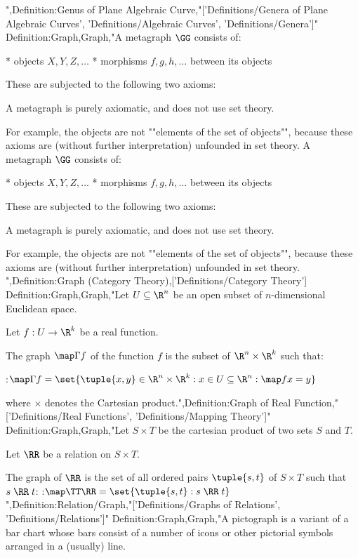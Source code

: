 ",Definition:Genus of Plane Algebraic Curve,"['Definitions/Genera of Plane Algebraic Curves', 'Definitions/Algebraic Curves', 'Definitions/Genera']"
Definition:Graph,Graph,"A metagraph $\GG$ consists of:

* objects $X, Y, Z, \ldots$
* morphisms $f, g, h, \ldots$ between its objects

These are subjected to the following two axioms:







A metagraph is purely axiomatic, and does not use set theory.

For example, the objects are not ""elements of the set of objects"", because these axioms are (without further interpretation) unfounded in set theory.
A metagraph $\GG$ consists of:

* objects $X, Y, Z, \ldots$
* morphisms $f, g, h, \ldots$ between its objects

These are subjected to the following two axioms:







A metagraph is purely axiomatic, and does not use set theory.

For example, the objects are not ""elements of the set of objects"", because these axioms are (without further interpretation) unfounded in set theory.
",Definition:Graph (Category Theory),['Definitions/Category Theory']
Definition:Graph,Graph,"Let $U \subseteq \R^n$ be an open subset of $n$-dimensional Euclidean space.

Let $f : U \to \R^k$ be a real function.


The graph $\map \Gamma f$ of the function $f$ is the subset of $\R^n \times \R^k$ such that:

:$\map \Gamma f = \set {\tuple {x, y} \in \R^n \times \R^k: x \in U \subseteq \R^n : \map f x = y}$

where $\times$ denotes the Cartesian product.",Definition:Graph of Real Function,"['Definitions/Real Functions', 'Definitions/Mapping Theory']"
Definition:Graph,Graph,"Let $S \times T$ be the cartesian product of two sets $S$ and $T$.

Let $\RR$ be a relation on $S \times T$.


The graph of $\RR$ is the set of all ordered pairs $\tuple {s, t}$ of $S \times T$ such that $s \mathrel \RR t$:
:$\map \TT \RR = \set {\tuple {s, t}: s \mathrel \RR t}$
",Definition:Relation/Graph,"['Definitions/Graphs of Relations', 'Definitions/Relations']"
Definition:Graph,Graph,"A pictograph is a variant of a bar chart whose  bars consist of a number of icons or other pictorial symbols arranged in a (usually) line.


